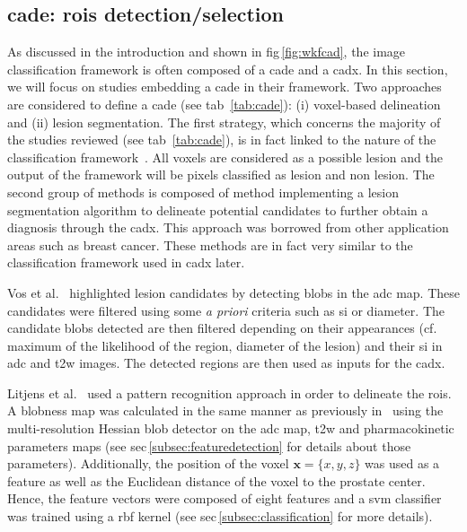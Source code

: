 \subsection{\ac{cade}: \acp{roi} detection/selection}\label{cade}

As discussed in the introduction and shown in \ac{fig}\,\ref{fig:wkfcad}, the image classification framework is often composed of a \ac{cade} and a \ac{cadx}. In this section, we will focus on studies embedding a \ac{cade} in their framework. Two approaches are considered to define a \ac{cade} (see \ac{tab}~\ref{tab:cade}): (i) voxel-based delineation and (ii) lesion segmentation.
The first strategy, which concerns the majority of the studies reviewed (see \ac{tab}~\ref{tab:cade}), is in fact linked to the nature of the classification framework~\cite{Artan2009,Artan2010,Giannini2013,Kelm2007,Liu2009,Lopes2011,Matulewicz2013,Mazzetti2011,Ozer2009,Ozer2010,Parfait2012,Sung2011,Tiwari2007,Tiwari2008,Tiwari2009,Tiwari2009a,Tiwari2010,Tiwari2012,Tiwari2013,Viswanath2008,Viswanath2008a,Viswanath2009,Viswanath2011,Viswanath2012}. All voxels are considered as a possible lesion and the output of the framework will be pixels classified as lesion and non lesion.
The second group of methods is composed of method implementing a lesion segmentation algorithm to delineate potential candidates to further obtain a diagnosis through the \ac{cadx}. This approach was borrowed from other application areas such as breast cancer. These methods are in fact very similar to the classification framework used in \ac{cadx} later.

Vos et al.~\cite{Vos2012} highlighted lesion candidates by detecting blobs in the \ac{adc} map. These candidates were filtered using some \textit{a priori} criteria such as \ac{si} or diameter. The candidate blobs detected are then filtered depending on their appearances (cf. maximum of the likelihood of the region, diameter of the lesion) and their \ac{si} in \ac{adc} and \ac{t2w} images. The detected regions are then used as inputs for the \ac{cadx}.

Litjens et al.~\cite{Litjens2011} used a pattern recognition approach in order to delineate the \acp{roi}. A blobness map was calculated in the same manner as previously in~\cite{Vos2010} using the multi-resolution Hessian blob detector on the \ac{adc} map, \ac{t2w} and pharmacokinetic parameters maps (see \ac{sec}\,\ref{subsec:featuredetection} for details about those parameters). Additionally, the position of the voxel $\mathbf{x}=\{x,y,z\}$ was used as a feature as well as the Euclidean distance of the voxel to the prostate center. Hence, the feature vectors were composed of eight features and a \ac{svm} classifier was trained using a \ac{rbf} kernel (see \ac{sec}\,\ref{subsec:classification} for more details).

